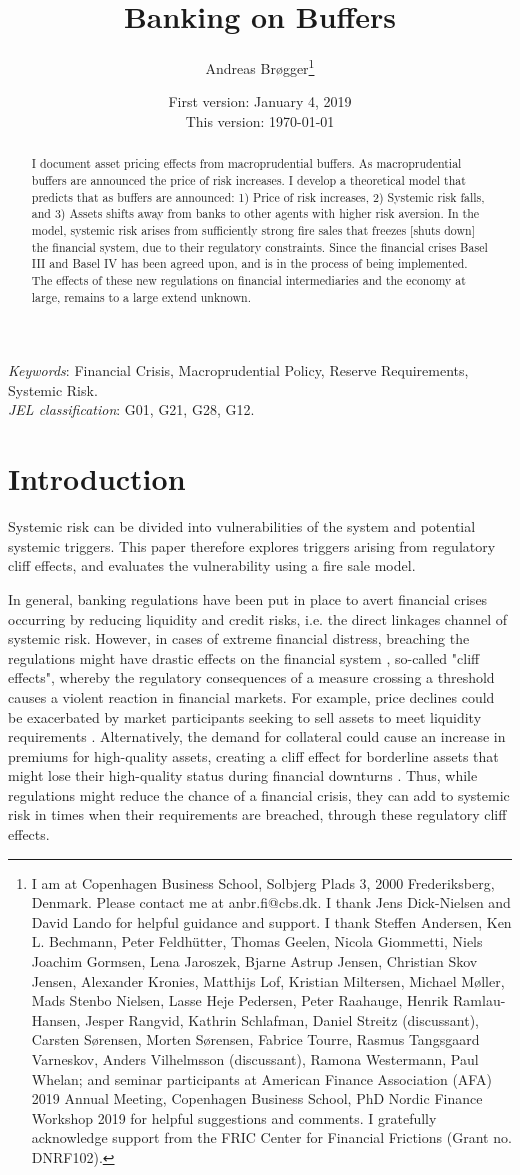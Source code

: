\documentclass[11pt]{article}
\title{\Huge Banking on Buffers}
\author{\Large Andreas Br\o gger\thanks{
\small
I am at
Copenhagen Business School, Solbjerg Plads 3, 2000 Frederiksberg, Denmark.
Please contact me at anbr.fi@cbs.dk.
I thank Jens Dick-Nielsen and David Lando for helpful guidance and support.
I thank Steffen Andersen, Ken L. Bechmann, Peter Feldh\"{u}tter, Thomas Geelen, Nicola Giommetti, Niels Joachim Gormsen, Lena Jaroszek, Bjarne Astrup Jensen, Christian Skov Jensen, Alexander Kronies, Matthijs Lof, Kristian Miltersen, Michael M\o ller, Mads Stenbo Nielsen, Lasse Heje Pedersen, Peter Raahauge, Henrik Ramlau-Hansen, Jesper Rangvid, Kathrin Schlafman, Daniel Streitz (discussant), Carsten S\o rensen, Morten S\o rensen, Fabrice Tourre, Rasmus Tangsgaard Varneskov, Anders Vilhelmsson (discussant), Ramona Westermann, Paul Whelan; and seminar participants at American Finance Association (AFA) 2019 Annual Meeting, Copenhagen Business School, PhD Nordic Finance Workshop 2019 for helpful suggestions and comments. I gratefully acknowledge support from the FRIC Center for Financial Frictions (Grant no. DNRF102).}
}
\date{\Large First version: January 4, 2019\\This version: \today}
\begin{document}
\maketitle
\thispagestyle{empty} %

\begin{abstract}
\noindent I document asset pricing effects from macroprudential buffers. As macroprudential buffers are announced the price of risk increases. I develop a theoretical model that predicts that as buffers are announced: 1) Price of risk increases, 2) Systemic risk falls, and 3) Assets shifts away from banks to other agents with higher risk aversion. In the model, systemic risk arises from sufficiently strong fire sales that freezes [shuts down] the financial system, due to their regulatory constraints. Since the financial crises Basel III and Basel IV has been agreed upon, and is in the process of being implemented. The effects of these new regulations on financial intermediaries and the economy at large, remains to a large extend unknown.
\end{abstract}

\noindent \textit{Keywords}: Financial Crisis, Macroprudential Policy, Reserve Requirements, Systemic Risk.\\
\noindent \textit{JEL classification}: G01, G21, G28, G12.

\clearpage
\setcounter{footnote}{0}
\renewcommand{\thefootnote}{\arabic{footnote}}
\setcounter{page}{1}


\section*{Introduction}
Systemic risk can be divided into vulnerabilities of the system and potential systemic triggers. This paper therefore explores triggers arising from regulatory cliff effects, and evaluates the vulnerability using a fire sale model.

In general, banking regulations have been put in place to avert financial crises occurring by reducing liquidity and credit risks, i.e. the direct linkages channel of systemic risk. However, in cases of extreme financial distress, breaching the regulations might have drastic effects on the financial system \citep{CruzLopez2013}, so-called "cliff effects", whereby the regulatory consequences of a measure crossing a threshold causes a violent reaction in financial markets.  For example, price declines could be exacerbated by market participants seeking to sell assets to meet liquidity requirements \citep{Gorton2009}. Alternatively, the demand for collateral could cause an increase in premiums for high-quality assets, creating a cliff effect for borderline assets that might lose their high-quality status during financial downturns \citep{IMF2012}. Thus, while regulations might reduce the chance of a financial crisis, they can add to systemic risk in times when their requirements are breached, through these regulatory cliff effects.
\end{document}
